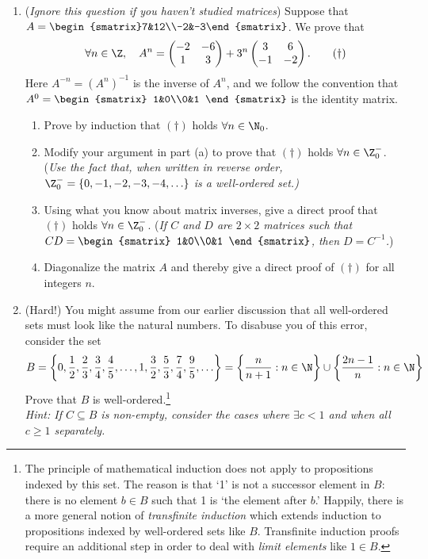 \begin{enumerate}
	\item (\emph{Ignore this question if you haven't studied matrices}) Suppose that $A=\begin{smatrix}7&12\\-2&-3\end{smatrix}$. We prove that
	\[\forall n\in\Z,\quad A^n=\begin{pmatrix}-2&-6\\1&3\end{pmatrix}+3^n\begin{pmatrix}3&6\\-1&-2\end{pmatrix}.\tag*{($\dag$)}\]
	Here $A^{-n}=(A^n)^{-1}$ is the inverse of $A^n$, and we follow the convention that $A^0=\begin{smatrix}
	1&0\\0&1
	\end{smatrix}$ is the identity matrix.
	\begin{enumerate}
  	\item Prove by induction that $(\dag)$ holds $\forall n\in\N_0$.
		\item Modify your argument in part (a) to prove that $(\dag)$ holds $\forall n\in\Z^-_0$. (\emph{Use the fact that, when written in reverse order, $\Z_0^-=\{0,-1,-2,-3,-4,\ldots\}$ is a well-ordered set.)}
		\item Using what you know about matrix inverses, give a direct proof that $(\dag)$ holds $\forall n\in\Z^-_0$. 		(\emph{If $C$ and $D$ are $2\times 2$ matrices such that $CD=\begin{smatrix}
		1&0\\0&1
		\end{smatrix}$, then $D=C^{-1}$.})
		\item Diagonalize the matrix $A$ and thereby give a direct proof of $(\dag)$ for all integers $n$.
	\end{enumerate}
	
	\item (Hard!) You might assume from our earlier discussion that all well-ordered sets must look like the natural numbers.	To disabuse you of this error, consider the set
	\[B=\left\{0,\frac 12,\frac 23,\frac 34,\frac 45,\ldots,1,\frac 32,\frac 53,\frac 74,\frac 95,\ldots\right\}=\left\{\frac n{n+1}:n\in\N\right\}\cup\left\{\frac{2n-1}{n}:n\in\N\right\}\]
	Prove that $B$ is well-ordered.\footnote{The principle of mathematical induction does not apply to propositions indexed by this set. The reason is that `1' is not a successor element in $B$: there is no element $b\in B$ such that 1 is `the element after $b$.' Happily, there is a more general notion of \emph{transfinite induction} which extends induction to propositions indexed by well-ordered sets like $B$. Transfinite induction proofs require an additional step in order to deal with \emph{limit elements} like $1\in B$.}\\[2pt]
	\emph{Hint: If $C\subseteq B$ is non-empty, consider the cases where $\exists c<1$ and when all $c\ge 1$ separately.}


\end{enumerate}
